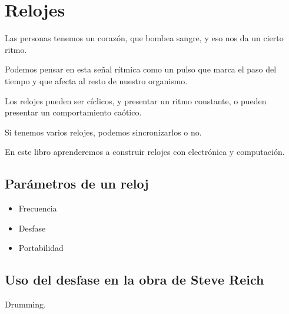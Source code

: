\documentclass[../principal.tex]{subfiles}
\begin{document}
\chapter{Relojes}

Las personas tenemos un corazón, que bombea sangre, y eso nos da un cierto ritmo.

Podemos pensar en esta señal rítmica como un pulso que marca el paso del tiempo y que afecta al resto de nuestro organismo.

Los relojes pueden ser cíclicos, y presentar un ritmo constante, o pueden presentar un comportamiento caótico.

Si tenemos varios relojes, podemos sincronizarlos o no.

En este libro aprenderemos a construir relojes con electrónica y computación.

\section{Parámetros de un reloj}

\begin{itemize}
    \item Frecuencia
    \item Desfase
    \item Portabilidad
\end{itemize}

\section{Uso del desfase en la obra de Steve Reich}

Drumming.

\newpage
\end{document}
